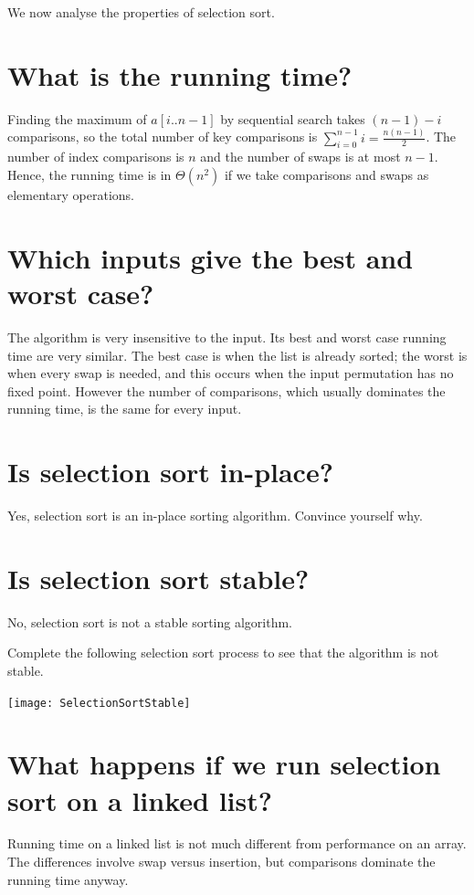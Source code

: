 We now analyse the properties of selection sort.

\section{What is the running time?}
Finding the maximum of $a[i..n-1]$ by sequential search takes $(n-1) - i$ 
comparisons, so the total number of key comparisons is $\sum_{i=0}^{n-1} i  = \frac{n(n-1)}{2}$.
The number of index comparisons is $n$ and the number of swaps is at most $n - 1$.
Hence, the running time is in $\Theta(n^2)$ if we take comparisons and swaps as 
elementary operations.

\section{Which inputs give the best and worst case?}
The algorithm is very insensitive to the input. 
Its best and worst case running time are very similar. 
The best case is when the list is already sorted; the worst is when every swap is needed, 
and this occurs when the input permutation has no fixed point. However the number of comparisons, which usually dominates the running time, 
is the same for every input.

\section{Is selection sort in-place?}
Yes, selection sort is an in-place sorting algorithm. Convince yourself why.

\section{Is selection sort stable?}
No, selection sort is not a stable sorting algorithm.
\begin{Boxample}[0]
Complete the following selection sort process to see that the algorithm is not stable.
\begin{center}
\texttt{[image: SelectionSortStable]} 
\end{center}
\end{Boxample}

\section{What happens if we run selection sort on a linked list?}
Running time on a linked list is not much different from performance on an array. 
The differences involve swap versus insertion, but comparisons dominate the running time anyway.

